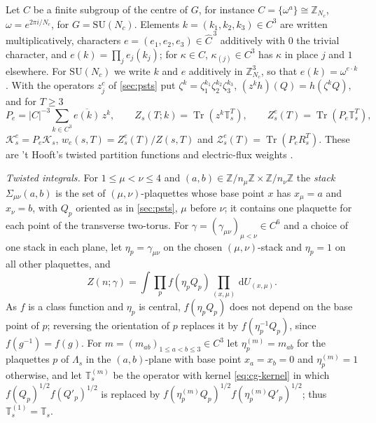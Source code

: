 \documentclass[11pt,a4paper]{amsart}
\theoremstyle{definition}
\theoremstyle{remark}
\numberwithin{equation}{section}
\DeclareMathOperator{\Tr}{Tr}        %
\newcommand{\Z}{\mathbb{Z}}          %
\newcommand{\Kspace}{\mathcal{K}}    %
\newcommand{\abs}[1]{\lvert #1\rvert}      %
\newcommand{\dd}{\,\mathrm{d}}             %
\newcommand{\SU}{\mathrm{SU}}              %
\newcommand{\TT}{\mathbb{T}}               %
\newcommand{\Zpart}[2]{Z(#1,#2)}           %
\newcommand{\Zc}{\mathcal{Z}}              %
\begin{document}
Let $C$ be a finite subgroup of the centre of $G$, for instance $C=\{\omega^a\}\cong\Z_{N_c}$, $\omega=e^{2\pi i/N_c}$, for $G=\SU(N_c)$. Elements $k=(k_1,k_2,k_3)\in C^3$ are written multiplicatively, characters $e=(e_1,e_2,e_3)\in\widehat C^{\,3}$ additively with $0$ the trivial character, and $e(k)=\prod_je_j(k_j)$; for $\kappa\in C$, $\kappa_{(j)}\in C^3$ has $\kappa$ in place $j$ and $1$ elsewhere. For $\SU(N_c)$ we write $k$ and $e$ additively in $\Z_{N_c}^3$, so that $e(k)=\omega^{e\cdot k}$. With the operators $z_j^c$ of \cref{sec:psts} put $\zeta^k=\zeta_1^{k_1}\zeta_2^{k_2}\zeta_3^{k_3}$, $(z^kh)(Q)=h(\zeta^kQ)$, and for $T\ge3$
\begin{equation}\label{eq:cg-sectors}
P_e=\abs{C}^{-3}\sum_{k\in C^3}\overline{e(k)}\,z^k,\qquad Z_s(T;k)=\Tr(z^k\TT_s^T),\qquad Z^e_s(T)=\Tr(P_e\TT_s^T),
\end{equation}
$\Kspace^e_s=P_e\Kspace_s$, $w_e(s,T)=Z^e_s(T)/\Zpart{s}{T}$ and $\Zc^e_s(T)=\Tr(P_eR_s^T)$. These are 't Hooft's twisted partition functions and electric-flux weights \cite{thooft1979}.

\emph{Twisted integrals.} For $1\le\mu<\nu\le4$ and $(a,b)\in\Z/n_\mu\Z\times\Z/n_\nu\Z$ the \emph{stack} $\Sigma_{\mu\nu}(a,b)$ is the set of $(\mu,\nu)$-plaquettes whose base point $x$ has $x_\mu=a$ and $x_\nu=b$, with $Q_p$ oriented as in \cref{sec:psts}, $\mu$ before $\nu$; it contains one plaquette for each point of the transverse two-torus. For $\gamma=(\gamma_{\mu\nu})_{\mu<\nu}\in C^6$ and a choice of one stack in each plane, let $\eta_p=\gamma_{\mu\nu}$ on the chosen $(\mu,\nu)$-stack and $\eta_p=1$ on all other plaquettes, and
\begin{equation}\label{eq:cg-twisted}
Z(n;\gamma)=\int\prod_pf(\eta_pQ_p)\prod_{(x,\mu)}\dd U_{(x,\mu)} .
\end{equation}
As $f$ is a class function and $\eta_p$ is central, $f(\eta_pQ_p)$ does not depend on the base point of $p$; reversing the orientation of $p$ replaces it by $f(\eta_p^{-1}Q_p)$, since $f(g^{-1})=f(g)$. For $m=(m_{ab})_{1\le a<b\le3}\in C^3$ let $\eta^{(m)}_p=m_{ab}$ for the plaquettes $p$ of $\Lambda_s$ in the $(a,b)$-plane with base point $x_a=x_b=0$ and $\eta^{(m)}_p=1$ otherwise, and let $\TT_s^{(m)}$ be the operator with kernel \eqref{eq:cg-kernel} in which $f(Q_p)^{1/2}f(Q'_p)^{1/2}$ is replaced by $f(\eta^{(m)}_pQ_p)^{1/2}f(\eta^{(m)}_pQ'_p)^{1/2}$; thus $\TT_s^{(1)}=\TT_s$.
\end{document}
